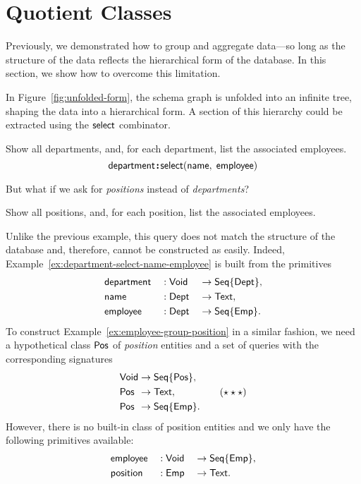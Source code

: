 
\section{Quotient Classes}
\label{sec:quotients}

Previously, we demonstrated how to group and aggregate data---so long as the
structure of the data reflects the hierarchical form of the database.  In this
section, we show how to overcome this limitation.

In Figure~\ref{fig:unfolded-form}, the schema graph is unfolded into an
infinite tree, shaping the data into a hierarchical form.  A section of this
hierarchy could be extracted using the $\mathsf{select}$ combinator.

\begin{demo}
    \label{ex:department-select-name-employee}
    Show all departments, and, for each department, list the associated
    employees.
    \begin{equation*}
        \mathsf{department}\!\boldsymbol{:}\!\mathsf{select}(\mathsf{name},\; \mathsf{employee})
    \end{equation*}
\end{demo}
But what if we ask for \emph{positions} instead of \emph{departments}?

\begin{demo}
    \label{ex:employee-group-position}
    Show all positions, and, for each position, list the associated employees.
\end{demo}

Unlike the previous example, this query does not match the structure of the
database and, therefore, cannot be constructed as easily.  Indeed,
Example~\ref{ex:department-select-name-employee} is built from the primitives
\begin{alignat*}{3}
    & \mathsf{department} && : \mathsf{Void} && \to \mathsf{Seq}{\left\{\mathsf{Dept}\right\}}, \\
    & \mathsf{name} && : \mathsf{Dept} && \to \mathsf{Text}, \\
    & \mathsf{employee} && : \mathsf{Dept} && \to \mathsf{Seq}{\left\{\mathsf{Emp}\right\}}.
\end{alignat*}
To construct Example~\ref{ex:employee-group-position} in a similar fashion, we
need a hypothetical class $\mathsf{Pos}$ of \emph{position} entities and a set of
queries with the corresponding signatures
\begin{equation}
    \label{eq:group-components}
    \begin{alignedat}{2}
        & \mathsf{Void} && \to \mathsf{Seq}{\left\{\mathsf{Pos}\right\}}, \\
        & \mathsf{Pos} && \to \mathsf{Text}, \\
        & \mathsf{Pos} && \to \mathsf{Seq}{\left\{\mathsf{Emp}\right\}}.
    \end{alignedat} \tag{$\star\star\star$}
\end{equation}
However, there is no built-in class of position entities and we only have the
following primitives available:
\begin{alignat*}{3}
    & \mathsf{employee} && : \mathsf{Void} && \to \mathsf{Seq}{\left\{\mathsf{Emp}\right\}}, \\
    & \mathsf{position} && : \mathsf{Emp} && \to \mathsf{Text}.
\end{alignat*}

